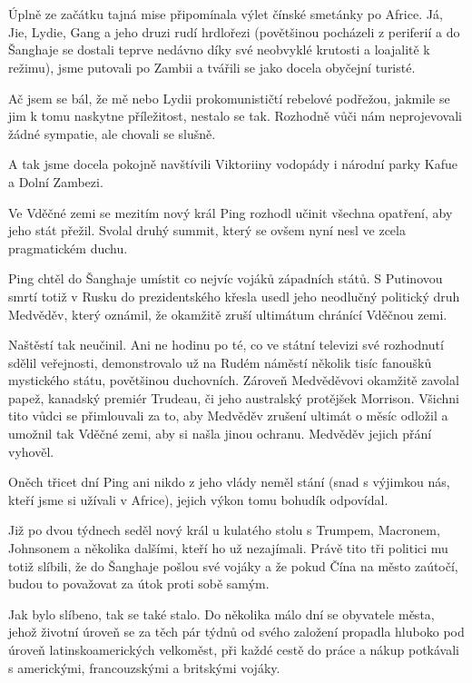 \chapter{}

Úplně ze začátku tajná mise připomínala výlet čínské smetánky po Africe. Já, Jie, Lydie, Gang a jeho druzi rudí hrdlořezi (povětšinou pocházeli z periferií a do Šanghaje se dostali teprve nedávno díky své neobvyklé krutosti a loajalitě k režimu), jsme putovali po Zambii a tvářili se jako docela obyčejní turisté.

Ač jsem se bál, že mě nebo Lydii prokomunističtí rebelové podřežou, jakmile se jim k tomu naskytne příležitost, nestalo se tak. Rozhodně vůči nám neprojevovali žádné sympatie, ale chovali se slušně.

A tak jsme docela pokojně navštívili Viktoriiny vodopády i národní parky Kafue a Dolní Zambezi.
\vspace{0.75cm}

Ve Vděčné zemi se mezitím nový král Ping rozhodl učinit všechna opatření, aby jeho stát přežil. Svolal druhý summit, který se ovšem nyní nesl ve zcela pragmatickém duchu.

Ping chtěl do Šanghaje umístit co nejvíc vojáků západních států. S Putinovou smrtí totiž v Rusku do prezidentského křesla usedl jeho neodlučný politický druh Medvěděv, který oznámil, že okamžitě zruší ultimátum chránící Vděčnou zemi.

Naštěstí tak neučinil. Ani ne hodinu po té, co ve státní televizi své rozhodnutí sdělil veřejnosti, demonstrovalo už na Rudém náměstí několik tisíc fanoušků mystického státu, povětšinou duchovních. Zároveň Medvěděvovi okamžitě zavolal papež, kanadský premiér Trudeau, či jeho australský protějšek Morrison. Všichni tito vůdci se přimlouvali za to, aby Medvěděv zrušení ultimát o měsíc odložil a umožnil tak Vděčné zemi, aby si našla jinou ochranu. Medvěděv jejich přání vyhověl.

Oněch třicet dní Ping ani nikdo z jeho vlády neměl stání (snad s výjimkou nás, kteří jsme si užívali v Africe), jejich výkon tomu bohudík odpovídal.

Již po dvou týdnech seděl nový král u kulatého stolu s Trumpem, Macronem, Johnsonem a několika dalšími, kteří ho už nezajímali. Právě tito tři politici mu totiž slíbili, že do Šanghaje pošlou své vojáky a že pokud Čína na město zaútočí, budou to považovat za útok proti sobě samým.

Jak bylo slíbeno, tak se také stalo. Do několika málo dní se obyvatele města, jehož životní úroveň se za těch pár týdnů od svého založení propadla hluboko pod úroveň latinskoamerických velkoměst, při každé cestě do práce a nákup potkávali s americkými, francouzskými a britskými vojáky.

